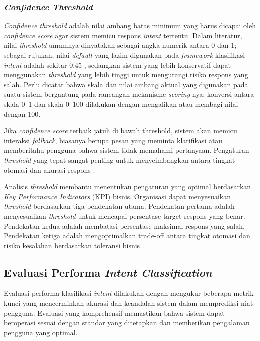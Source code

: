 \subsubsection{\textit{Confidence Threshold}}

\textit{Confidence threshold} adalah nilai ambang batas minimum yang harus dicapai oleh \textit{confidence score} agar sistem memicu respons \textit{intent} tertentu. Dalam literatur, nilai \textit{threshold} umumnya dinyatakan sebagai angka numerik antara 0 dan 1; sebagai rujukan, nilai \textit{default} yang lazim digunakan pada \textit{framework} klasifikasi \textit{intent} adalah sekitar 0,45 \autocite{hengst2024conformal}, sedangkan sistem yang lebih konservatif dapat menggunakan \textit{threshold} yang lebih tinggi untuk mengurangi risiko respons yang salah. Perlu dicatat bahwa skala dan nilai ambang aktual yang digunakan pada suatu sistem bergantung pada rancangan mekanisme \textit{scoring}-nya; konversi antara skala 0--1 dan skala 0--100 dilakukan dengan mengalikan atau membagi nilai dengan 100.

Jika \textit{confidence score} terbaik jatuh di bawah threshold, sistem akan memicu interaksi \textit{fallback}, biasanya berupa pesan yang meminta klarifikasi atau memberitahu pengguna bahwa sistem tidak memahami pertanyaan. Pengaturan \textit{threshold} yang tepat sangat penting untuk menyeimbangkan antara tingkat otomasi dan akurasi respons \autocite{cyara2024optimum}.

Analisis \textit{threshold} membantu menentukan pengaturan yang optimal berdasarkan \textit{Key Performance Indicators} (KPI)\label{abbr:KPI} bisnis. Organisasi dapat menyesuaikan \textit{threshold} berdasarkan tiga pendekatan utama. Pendekatan pertama adalah menyesuaikan \textit{threshold} untuk mencapai persentase target respons yang benar. Pendekatan kedua adalah membatasi persentase maksimal respons yang salah. Pendekatan ketiga adalah mengoptimalkan trade-off antara tingkat otomasi dan risiko kesalahan berdasarkan toleransi bisnis \autocite{cyara2024optimum,genesys2023threshold}.

\subsection{Evaluasi Performa \textit{Intent Classification}}

Evaluasi performa klasifikasi \textit{intent} dilakukan dengan mengukur beberapa metrik kunci yang mencerminkan akurasi dan keandalan sistem dalam memprediksi niat pengguna. Evaluasi yang komprehensif memastikan bahwa sistem dapat beroperasi sesuai dengan standar yang ditetapkan dan memberikan pengalaman pengguna yang optimal.


